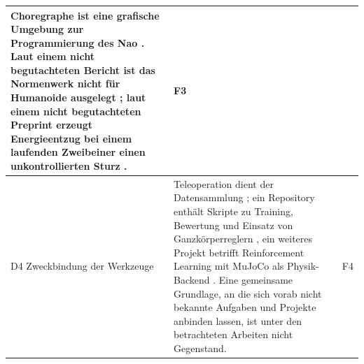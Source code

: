 \begin{table}[htbp]
\begin{tabularx}{\textwidth}{|P{2.6cm}|L|P{1.3cm}|}
        Choregraphe ist eine grafische Umgebung zur Programmierung des Nao \cite{Pot2009}.
        Laut einem nicht begutachteten Bericht ist das Normenwerk nicht für Humanoide ausgelegt \cite{Prather2025}; laut einem nicht begutachteten Preprint erzeugt Energieentzug bei einem laufenden Zweibeiner einen unkontrollierten Sturz \cite{Ding2026}. &
        F3\\\hline
        D4 Zweckbindung der Werkzeuge &
        Teleoperation dient der Datensammlung \cite{Cheng2024}; ein Repository enthält Skripte zu Training, Bewertung und Einsatz von Ganzkörperreglern \cite{NvidiaGR00TWBC}, ein weiteres Projekt betrifft Reinforcement Learning mit MuJoCo als Physik-Backend \cite{UnitreeRLMjlab}.
        Eine gemeinsame Grundlage, an die sich vorab nicht bekannte Aufgaben und Projekte anbinden lassen, ist unter den betrachteten Arbeiten nicht Gegenstand. &
        F4\\\hline
    \end{tabularx}
\end{table}

